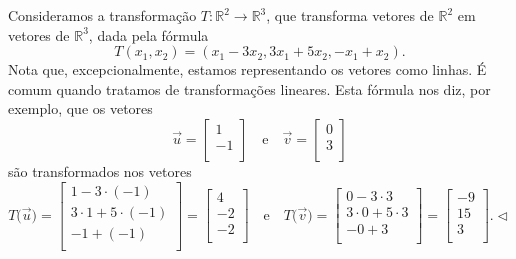 \begin{ex}\label{exp:7}
Consideramos a transformação $T: \mathbb{R}^2 \to \mathbb{R}^3$, que transforma vetores de $\mathbb{R}^2$ em vetores de $\mathbb{R}^3$, dada pela fórmula
\begin{equation}
T(x_1, x_2) = (x_1 - 3 x_2, 3x_1 + 5x_2, -x_1 + x_2).
\end{equation} Nota que, excepcionalmente, estamos representando os vetores como linhas. É comum quando tratamos de transformações lineares. Esta fórmula nos diz, por exemplo, que os vetores
\begin{equation}
\vec{u} =
\left[
  \begin{array}{c}
    1 \\
    -1 \\
  \end{array}
\right] \quad \text{e} \quad 
\vec{v} =
\left[
  \begin{array}{c}
    0 \\
    3 \\
  \end{array}
\right]
\end{equation} são transformados nos vetores
\begin{equation}
T\big(\vec{u}\big) =
\left[
  \begin{array}{c}
    1-3\cdot(-1) \\
    3\cdot 1 + 5\cdot(-1) \\
    -1 + (-1)\\
  \end{array}
\right] =
\left[
  \begin{array}{r}
     4 \\
    -2 \\
    -2 \\
  \end{array}
\right] \quad \text{e} \quad
T\big(\vec{v}\big) =
\left[
  \begin{array}{c}
    0-3\cdot 3 \\
    3\cdot 0 + 5\cdot 3 \\
    -0 + 3 \\
  \end{array}
\right] =
\left[
  \begin{array}{r}
    -9 \\
    15 \\
     3 \\
  \end{array}
\right].\lhd
\end{equation}
\end{ex}




